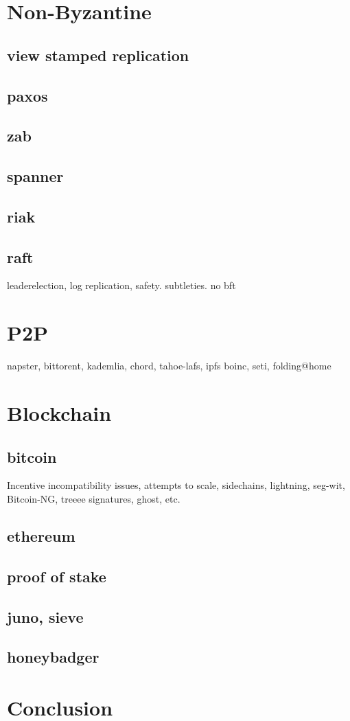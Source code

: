 \section{Non-Byzantine}
	\subsection{view stamped replication}
	\subsection{paxos}
	\subsection{zab}
	\subsection{spanner}
	\subsection{riak}
	\subsection{raft} leaderelection, log replication, safety. subtleties. no bft

\section{P2P}
	napster, bittorent, kademlia, chord, tahoe-lafs, ipfs
	boinc, seti, folding@home

\section{Blockchain}
	\subsection{bitcoin} Incentive incompatibility issues, attempts to scale, sidechains, lightning, seg-wit, Bitcoin-NG,
	treeee signatures, ghost, etc.
	\subsection{ethereum}
	\subsection{proof of stake}
	\subsection{juno, sieve}
	\subsection{honeybadger}


\section{Conclusion}

